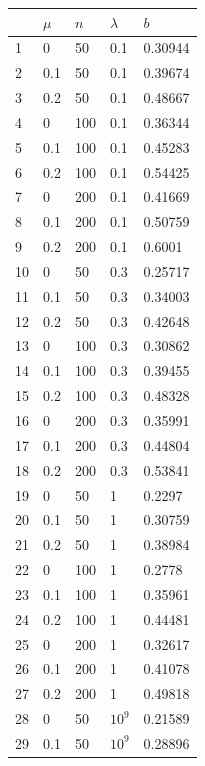 \begin{table}
  \begin{tabular}{|l|l|l|l|l|}
    \hline
       & $\mu$ & $n$ & $\lambda$  & $b$ \\
    \hline
    1  & 0   & 50  & 0.1   & 0.30944 \\
    2  & 0.1 & 50  & 0.1   & 0.39674 \\
    3  & 0.2 & 50  & 0.1   & 0.48667 \\
    4  & 0   & 100 & 0.1   & 0.36344 \\
    5  & 0.1 & 100 & 0.1   & 0.45283 \\
    6  & 0.2 & 100 & 0.1   & 0.54425 \\
    7  & 0   & 200 & 0.1   & 0.41669 \\
    8  & 0.1 & 200 & 0.1   & 0.50759 \\
    9  & 0.2 & 200 & 0.1   & 0.6001  \\
    10 & 0   & 50  & 0.3   & 0.25717 \\
    11 & 0.1 & 50  & 0.3   & 0.34003 \\
    12 & 0.2 & 50  & 0.3   & 0.42648 \\
    13 & 0   & 100 & 0.3   & 0.30862 \\
    14 & 0.1 & 100 & 0.3   & 0.39455 \\
    15 & 0.2 & 100 & 0.3   & 0.48328 \\
    16 & 0   & 200 & 0.3   & 0.35991 \\
    17 & 0.1 & 200 & 0.3   & 0.44804 \\
    18 & 0.2 & 200 & 0.3   & 0.53841 \\
    19 & 0   & 50  & 1     & 0.2297  \\
    20 & 0.1 & 50  & 1     & 0.30759 \\
    21 & 0.2 & 50  & 1     & 0.38984 \\
    22 & 0   & 100 & 1     & 0.2778  \\
    23 & 0.1 & 100 & 1     & 0.35961 \\
    24 & 0.2 & 100 & 1     & 0.44481 \\
    25 & 0   & 200 & 1     & 0.32617 \\
    26 & 0.1 & 200 & 1     & 0.41078 \\
    27 & 0.2 & 200 & 1     & 0.49818 \\
    28 & 0   & 50  & $10^9$ & 0.21589 \\
    29 & 0.1 & 50  & $10^9$ & 0.28896 \\

\end{tabular}
\end{table}
